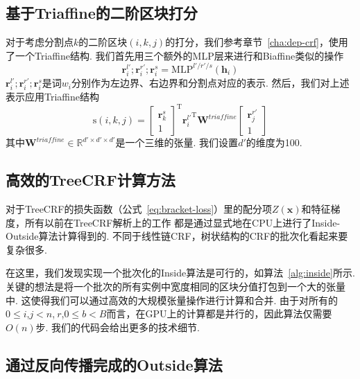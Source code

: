 \subsection{基于Triaffine的二阶区块打分}
对于考虑分割点$k$的二阶区块$(i,k,j)$的打分，我们参考章节~\ref{cha:dep-crf}，使用了一个Triaffine结构.
我们首先用三个额外的MLP层来进行和Biaffine类似的操作
\begin{equation}
  \label{con-mlp-sib}
  \mathbf{r}_i^{l'}; \mathbf{r}_i^{r'}; \mathbf{r}_i^{s} =\mathrm{MLP}^{l'/r'/s} \left( \mathbf{h}_i \right)
\end{equation}
$\mathbf{r}_i^{l'}; \mathbf{r}_i^{r'}; \mathbf{r}_i^{s}$是词$w_i$分别作为左边界、右边界和分割点对应的表示.
然后，我们对上述表示应用Triaffine结构
\begin{equation} \label{eq:con-triaffine}
  \mathrm{s}(i,k,j) =
  \left[
    \begin{array}{c}
      \mathbf{r}_{k}^{s} \\
      1
    \end{array}
    \right]^\mathrm{T}
  {\mathbf{r}_{i}^{l'}}^\mathrm{T}
  \mathbf{W}^\textit{triaffine}
  \left[
    \begin{array}{c}
      \mathbf{r}_{j}^{r'} \\
      1
    \end{array}
    \right]
\end{equation}
其中$\mathbf{W}^\textit{triaffine} \in \mathbb{R}^{d' \times d' \times d'}$是一个三维的张量.
我们设置$d'$的维度为100.



\subsection{高效的TreeCRF计算方法}

对于TreeCRF的损失函数（公式~\ref{eq:bracket-loss}）里的配分项$Z(\boldsymbol{x})$和特征梯度，所有以前在TreeCRF解析上的工作 \citep{finkel-etal-2008-efficient,durrett-klein-2015-neural}都是通过显式地在CPU上进行了Inside-Outside算法计算得到的.
不同于线性链CRF，树状结构的CRF的批次化看起来要复杂很多.

在这里，我们发现实现一个批次化的Inside算法是可行的，如算法~\ref{alg:inside}所示.
关键的想法是将一个批次的所有实例中宽度相同的区块分值打包到一个大的张量中.
这使得我们可以通过高效的大规模张量操作进行计算和合并.
由于对所有的$0 \le i$,$j<n$,$~r$,$0\le b<B$而言，在GPU上的计算都是并行的，因此算法仅需要$O(n)$步.
我们的代码会给出更多的技术细节.

\subsection{通过反向传播完成的Outside算法}

